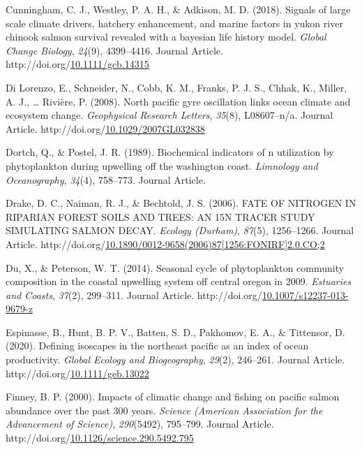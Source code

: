 \documentclass [11pt, proquest] {uwthesis}[2015/03/03]
\newlength{\cslhangindent}
\newenvironment{CSLReferences}%
{\setlength{\parindent}{0pt}%
\everypar{\setlength{\hangindent}{\cslhangindent}}\ignorespaces}%
{\par}
\begin{document}
\begin{CSLReferences}{1}{0}
\leavevmode\hypertarget{ref-Cunningham2018}{}%
Cunningham, C. J., Westley, P. A. H., \& Adkison, M. D. (2018). Signals of large scale climate drivers, hatchery enhancement, and marine factors in yukon river chinook salmon survival revealed with a bayesian life history model. \emph{Global Change Biology}, \emph{24}(9), 4399--4416. Journal Article. http://doi.org/\href{https://doi.org/10.1111/gcb.14315}{10.1111/gcb.14315}

\leavevmode\hypertarget{ref-DiLorenzo2008}{}%
Di Lorenzo, E., Schneider, N., Cobb, K. M., Franks, P. J. S., Chhak, K., Miller, A. J., \ldots{} Rivière, P. (2008). North pacific gyre oscillation links ocean climate and ecosystem change. \emph{Geophysical Research Letters}, \emph{35}(8), L08607--n/a. Journal Article. http://doi.org/\href{https://doi.org/10.1029/2007GL032838}{10.1029/2007GL032838}

\leavevmode\hypertarget{ref-Dortch1989}{}%
Dortch, Q., \& Postel, J. R. (1989). Biochemical indicators of n utilization by phytoplankton during upwelling off the washington coast. \emph{Limnology and Oceanography}, \emph{34}(4), 758--773. Journal Article.

\leavevmode\hypertarget{ref-Drake2006}{}%
Drake, D. C., Naiman, R. J., \& Bechtold, J. S. (2006). FATE OF NITROGEN IN RIPARIAN FOREST SOILS AND TREES: AN 15N TRACER STUDY SIMULATING SALMON DECAY. \emph{Ecology (Durham)}, \emph{87}(5), 1256--1266. Journal Article. http://doi.org/\href{https://doi.org/10.1890/0012-9658(2006)87\%5B1256:FONIRF\%5D2.0.CO;2}{10.1890/0012-9658(2006)87{[}1256:FONIRF{]}2.0.CO;2}

\leavevmode\hypertarget{ref-Du2014}{}%
Du, X., \& Peterson, W. T. (2014). Seasonal cycle of phytoplankton community composition in the coastal upwelling system off central oregon in 2009. \emph{Estuaries and Coasts}, \emph{37}(2), 299--311. Journal Article. http://doi.org/\href{https://doi.org/10.1007/s12237-013-9679-z}{10.1007/s12237-013-9679-z}

\leavevmode\hypertarget{ref-Espinasse2020}{}%
Espinasse, B., Hunt, B. P. V., Batten, S. D., Pakhomov, E. A., \& Tittensor, D. (2020). Defining isoscapes in the northeast pacific as an index of ocean productivity. \emph{Global Ecology and Biogeography}, \emph{29}(2), 246--261. Journal Article. http://doi.org/\href{https://doi.org/10.1111/geb.13022}{10.1111/geb.13022}

\leavevmode\hypertarget{ref-Finney2000}{}%
Finney, B. P. (2000). Impacts of climatic change and fishing on pacific salmon abundance over the past 300 years. \emph{Science (American Association for the Advancement of Science)}, \emph{290}(5492), 795--799. Journal Article. http://doi.org/\href{https://doi.org/10.1126/science.290.5492.795}{10.1126/science.290.5492.795}


\end{CSLReferences}
\end{document}

